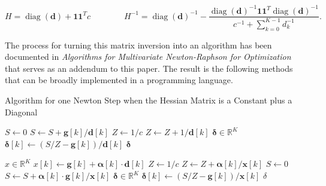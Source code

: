 \documentclass[twoside]{article}
\begin{document}
\begin{equation}
H=\operatorname{diag}(\mathbf{d}) + \mathbf{1}\mathbf{1}^Tc
\qquad \qquad
H^{-1}=\operatorname{diag}(\mathbf{d})^{-1}-\frac{\operatorname{diag}(\mathbf{d})^{-1}\mathbf{1}\mathbf{1}^T\operatorname{diag}(\mathbf{d})^{-1}}{c^{-1}+\sum_{k=0}^{K-1}d_k^{-1}}.
\label{eq:invert_hessian}
\end{equation}

The process for turning this matrix inversion into an algorithm has been documented in \textit{Algorithms for Multivariate Newton-Raphson for Optimization}\cite{addendum} that serves as an addendum to this paper. The result is the following methods that can be broadly implemented in a programming language.

\begin{algorithm}
  \caption{Algorithm for one Newton Step when the Hessian Matrix is a Constant plus a Diagonal}
  \begin{multicols}{2}
  \begin{algorithmic}
  \State $S \leftarrow 0$
    \State $S \leftarrow S + \mathbf{g}[k] / \mathbf{d}[k]$
  \EndFor
  \State $Z \leftarrow 1/c$
    \State $Z \leftarrow Z + 1 / \mathbf{d}[k]$
  \EndFor
  \State $\mathbf{\delta} \in \mathbb{R}^{K}$
    \State $\mathbf{\delta}[k] \gets (S/Z - \mathbf{g}[k]) / \mathbf{d}[k]$
  \EndFor
  \State \Return $\mathbf{\delta}$
  \EndFunction
  \end{algorithmic}
  \columnbreak
  \begin{algorithmic}
  \State $x \in \mathbb{R}^{K}$
    \State $x[k] \gets \mathbf{g}[k]+\mathbf{\alpha}[k] \cdot \mathbf{d}[k]$
  \EndFor
  \State $Z \gets 1/c$
    \State $Z \gets Z + \mathbf{\alpha}[k] / \mathbf{x}[k]$
  \EndFor
  \State $S \gets 0$
    \State $S \gets S + \mathbf{\alpha}[k] \cdot \mathbf{g}[k]/\mathbf{x}[k]$
  \EndFor
  \State $\mathbf{\delta} \in \mathbb{R}^{K}$
    \State $\mathbf{\delta}[k] \gets (S / Z - \mathbf{g}[k]) / \mathbf{x}[k]$ \EndFor
  \State \Return $\delta$
  \EndFunction
  \end{algorithmic}
  \end{multicols}
  \label{alg:step}
\end{algorithm}
\end{document}
